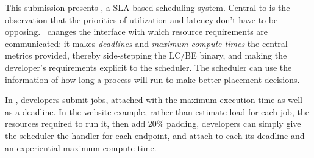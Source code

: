 This submission presents \textit{\sysname}, a SLA-based scheduling system.
Central to \sysname{} is the observation that the priorities of utilization and
latency don't have to be opposing.\ \sysname{} changes the interface with which
resource requirements are communicated: it makes \textit{deadlines} and
\textit{maximum compute times} the central metrics provided, thereby
side-stepping the LC/BE binary, and making the developer's requirements explicit
to the scheduler. The scheduler can use the information of how long a process
will run to make better placement decisions.

In \sysname{}, developers submit jobs, attached with the maximum execution time
as well as a deadline. In the website example, rather than estimate load for
each job, the resources required to run it, then add 20\% padding, developers
can simply give the scheduler the handler for each endpoint, and attach to each
its deadline and an experiential maximum compute time.